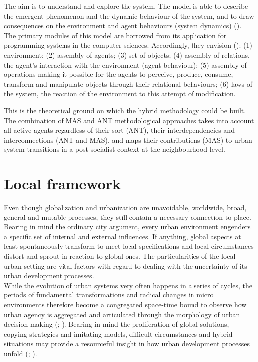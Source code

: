 \documentclass[11pt]{report}
\begin{document}
{{{{\begin{enumerate}
The aim is to understand and explore the system. The model is able to describe the emergent phenomenon and the dynamic behaviour of the system,  and to draw  consequences on the environment and agent behaviours (system dynamics) (\href{Diappi}{\citealt{diappi_smiths_2008}}). The primary modules of this model are borrowed from its application for programming systems in the computer sciences.
Accordingly, they envision (\href{Brown}{\citealt{brown_path_2005}}):
(1) environment;
(2) assembly of agents;
(3) set of objects;
(4) assembly of relations, the agent’s interaction with the environment (agent behaviour);
(5) assembly of operations making it possible for the agents to perceive, produce, consume, transform and manipulate objects through their relational behaviours;
(6) laws of the system, the reaction  of  the  environment  to  this  attempt  of  modification.
\end{enumerate}

This is the theoretical ground on which the hybrid methodology could be built. The combination of MAS and ANT methodological approaches takes into account all active agents regardless of their sort (ANT), their interdependencies and interconnections (ANT and MAS), and maps their contributions (MAS) to urban system transitions  in a post-socialist context at the neighbourhood level.

\section{Local framework}

Even though globalization and urbanization are unavoidable,  worldwide,  broad,  general  and  mutable  processes, they still  contain  a  necessary connection to place.
Bearing in mind the ordinary city argument, every urban environment engenders a specific set of internal and external influences.
If anything, global aspects at least spontaneously transform to meet local specifications and local circumstances distort and sprout in reaction to global ones. The particularities of the local urban setting are vital factors with regard to dealing with the uncertainty of its urban development processes.
\\

While the evolution of urban systems very often happens in a series of cycles, the periods of fundamental transformations and radical changes in micro environments therefore become a congregated space-time bound to observe how urban agency is aggregated and articulated through the morphology of urban decision-making (\href{Watson}{\citealt{watson_planning_1998}}; \href{Nedovic}{\citealt{nedovicbudic_waves_2006}}).
Bearing in mind the proliferation of global solutions, copying strategies and imitating models, difficult circumstances and hybrid situations may provide a resourceful insight in how urban development processes unfold (\href{Harrison}{\citealt{partington_case_2002}};  \href{Nedovic}{\citealt{nedovicbudic_waves_2006}}).
\\

}}}}
\end{document}
